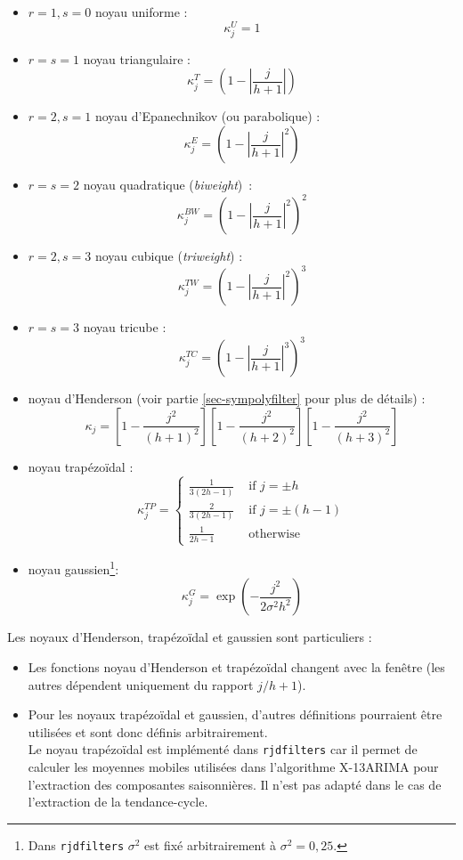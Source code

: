 \documentclass[
  12pt,
  french,
  12pt,a4paper]{article}
\newcommand\1{\mathds{1}}
\begin{document}
\begin{multicols}{2}

\begin{itemize}
\item
  \(r=1,s=0\) noyau uniforme :
  \[\kappa_j^U=1\]
\item
  \(r=s=1\) noyau triangulaire :
  \[\kappa_j^T=\left(
  1-
  \left\lvert
  \frac j {h+1}
  \right\lvert
  \right)\]
\item
  \(r=2,s=1\) noyau d'Epanechnikov (ou parabolique) :
  \[\kappa_j^E=\left(
  1-
  \left\lvert
  \frac j {h+1}
  \right\lvert^2
  \right)\]
\item
  \(r=s=2\) noyau quadratique (\emph{biweight})~:
  \[\kappa_j^{BW}=\left(
  1-
  \left\lvert
  \frac j {h+1}
  \right\lvert^2
  \right)^2\]
\item
  \(r = 2, s = 3\) noyau cubique (\emph{triweight}) :
  \[\kappa_j^{TW}=\left(
  1-
  \left\lvert
  \frac j {h+1}
  \right\lvert^2
  \right)^3\]
\item
  \(r = s = 3\) noyau tricube :
  \[\kappa_j^{TC}=\left(
  1-
  \left\lvert
  \frac j {h+1}
  \right\lvert^3
  \right)^3\]
\item
  noyau d'Henderson (voir partie \ref{sec-sympolyfilter} pour plus de détails) :
  \[
  \kappa_{j}=\left[1-\frac{j^2}{(h+1)^2}\right]
  \left[1-\frac{j^2}{(h+2)^2}\right]
  \left[1-\frac{j^2}{(h+3)^2}\right]
  \]
\item
  noyau trapézoïdal :
  \[
  \kappa_j^{TP}=
  \begin{cases}
  \frac{1}{3(2h-1)} & \text{ if }j=\pm h 
  \\
  \frac{2}{3(2h-1)} & \text{ if }j=\pm (h-1)\\
  \frac{1}{2h-1}& \text{ otherwise}
  \end{cases}
  \]
\item
  noyau gaussien\footnote{
    Dans \texttt{rjdfilters} \(\sigma^2\) est fixé arbitrairement à \(\sigma^2=0,25\).}:
  \[
  \kappa_j^G=\exp\left(
  -\frac{
  j^2
  }{
  2\sigma^2h^2
  }\right)
  \]
\end{itemize}

\end{multicols}

Les noyaux d'Henderson, trapézoïdal et gaussien sont particuliers :

\begin{itemize}
\item
  Les fonctions noyau d'Henderson et trapézoïdal changent avec la fenêtre (les autres dépendent uniquement du rapport \(j/h+1\)).
\item
  Pour les noyaux trapézoïdal et gaussien, d'autres définitions pourraient être utilisées et sont donc définis arbitrairement.\\
  Le noyau trapézoïdal est implémenté dans \texttt{rjdfilters} car il permet de calculer les moyennes mobiles utilisées dans l'algorithme X-13ARIMA pour l'extraction des composantes saisonnières.
  Il n'est pas adapté dans le cas de l'extraction de la tendance-cycle.
\end{itemize}
\end{document}
